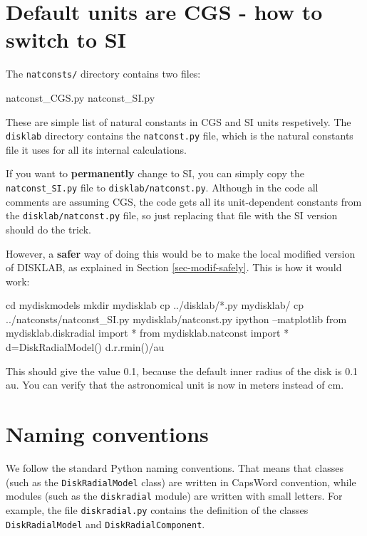 \documentclass{book}
\newcommand{\code}[1]{{\small\tt #1}}
\begin{document}
\section{Default units are CGS - how to switch to SI}
The \code{natconsts/} directory contains two files:
\begin{codebox}
natconst_CGS.py
natconst_SI.py
\end{codebox}
These are simple list of natural constants in CGS and SI units respetively.
The \code{disklab} directory contains the \code{natconst.py} file, which is
the natural constants file it uses for all its internal calculations.

If you want to {\bf permanently} change to SI, you can simply copy the
\code{natconst\_SI.py} file to \code{disklab/natconst.py}. Although in the
code all comments are assuming CGS, the code gets all its unit-dependent
constants from the \code{disklab/natconst.py} file, so just replacing
that file with the SI version should do the trick.

However, a {\bf safer} way of doing this would be to make the local modified
version of {\sf DISKLAB}, as explained in Section \ref{sec-modif-safely}.
This is how it would work:
\begin{codebox}
cd mydiskmodels
mkdir mydisklab
cp ../disklab/*.py mydisklab/
cp ../natconsts/natconst_SI.py mydisklab/natconst.py
ipython --matplotlib
from mydisklab.diskradial import *
from mydisklab.natconst import *
d=DiskRadialModel()
d.r.rmin()/au
\end{codebox}
This should give the value 0.1, because the default inner radius of the
disk is 0.1 au. You can verify that the astronomical unit is now in
meters instead of cm.


\section{Naming conventions}
We follow the standard Python naming conventions. That means that classes (such
as the \code{DiskRadialModel} class) are written in CapsWord convention, while modules
(such as the \code{diskradial} module) are written with small letters. For
example, the file \code{diskradial.py} contains the definition of the classes
\code{DiskRadialModel} and \code{DiskRadialComponent}.


\end{document}
